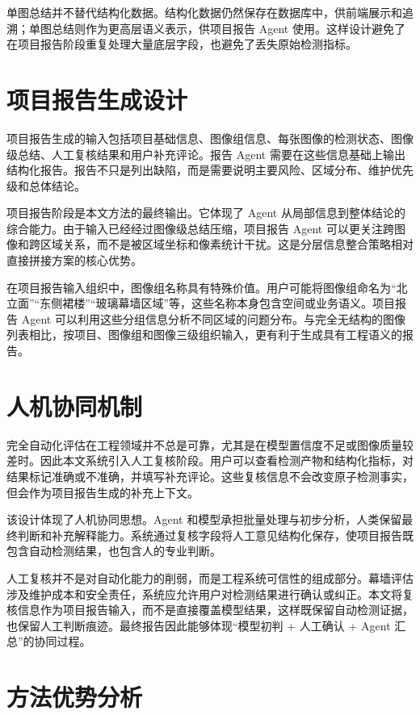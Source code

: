 单图总结并不替代结构化数据。结构化数据仍然保存在数据库中，供前端展示和追溯；单图总结则作为更高层语义表示，供项目报告 Agent 使用。这样设计避免了在项目报告阶段重复处理大量底层字段，也避免了丢失原始检测指标。

\section{项目报告生成设计}
\label{sec:project-report-design}

项目报告生成的输入包括项目基础信息、图像组信息、每张图像的检测状态、图像级总结、人工复核结果和用户补充评论。报告 Agent 需要在这些信息基础上输出结构化报告。报告不只是列出缺陷，而是需要说明主要风险、区域分布、维护优先级和总体结论。

项目报告阶段是本文方法的最终输出。它体现了 Agent 从局部信息到整体结论的综合能力。由于输入已经经过图像级总结压缩，项目报告 Agent 可以更关注跨图像和跨区域关系，而不是被区域坐标和像素统计干扰。这是分层信息整合策略相对直接拼接方案的核心优势。

在项目报告输入组织中，图像组名称具有特殊价值。用户可能将图像组命名为“北立面”“东侧裙楼”“玻璃幕墙区域”等，这些名称本身包含空间或业务语义。项目报告 Agent 可以利用这些分组信息分析不同区域的问题分布。与完全无结构的图像列表相比，按项目、图像组和图像三级组织输入，更有利于生成具有工程语义的报告。

\section{人机协同机制}
\label{sec:human-agent-collaboration}

完全自动化评估在工程领域并不总是可靠，尤其是在模型置信度不足或图像质量较差时。因此本文系统引入人工复核阶段。用户可以查看检测产物和结构化指标，对结果标记准确或不准确，并填写补充评论。这些复核信息不会改变原子检测事实，但会作为项目报告生成的补充上下文。

该设计体现了人机协同思想。Agent 和模型承担批量处理与初步分析，人类保留最终判断和补充解释能力。系统通过复核字段将人工意见结构化保存，使项目报告既包含自动检测结果，也包含人的专业判断。

人工复核并不是对自动化能力的削弱，而是工程系统可信性的组成部分。幕墙评估涉及维护成本和安全责任，系统应允许用户对检测结果进行确认或纠正。本文将复核信息作为项目报告输入，而不是直接覆盖模型结果，这样既保留自动检测证据，也保留人工判断痕迹。最终报告因此能够体现“模型初判 + 人工确认 + Agent 汇总”的协同过程。

\section{方法优势分析}
\label{sec:method-advantage}

